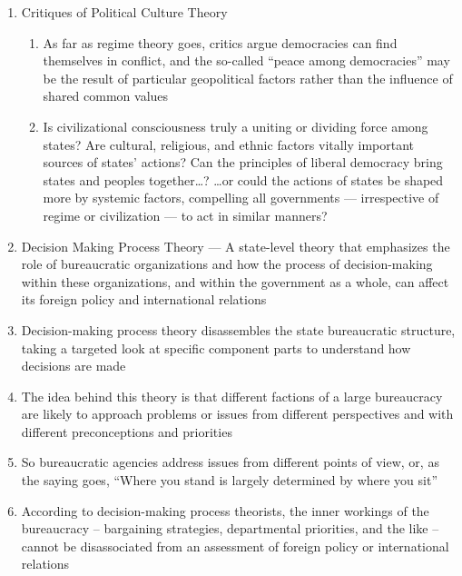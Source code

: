 \documentclass[12pt]{article}
\begin{document}
\begin{enumerate}
\begin{enumerate}
        \end{enumerate}

      \item Critiques of Political Culture Theory

        \begin{enumerate}

          \item As far as regime theory goes, critics argue democracies can find themselves in conflict, and the so-called “peace among democracies” may be the result of particular geopolitical factors rather than the influence of shared common values

          \item Is civilizational consciousness truly a uniting or dividing force among states? Are cultural, religious, and ethnic factors vitally important sources of states’ actions? Can the principles of liberal democracy bring states and peoples together\dots? \dots or could the actions of states be shaped more by systemic factors, compelling all governments — irrespective of regime or civilization — to act in similar manners?

        \end{enumerate}

      \item Decision Making Process Theory — A state-level theory that emphasizes the role of bureaucratic organizations and how the process of decision-making within these organizations, and within the government as a whole, can affect its foreign policy and international relations

      \item Decision-making process theory disassembles the state bureaucratic structure, taking a targeted look at specific component parts to understand how decisions are made

      \item The idea behind this theory is that different factions of a large bureaucracy are likely to approach problems or issues from different perspectives and with different preconceptions and priorities

      \item So bureaucratic agencies address issues from different points of view, or, as the saying goes, “Where you stand is largely determined by where you sit”

      \item According to decision-making process theorists, the inner workings of the bureaucracy – bargaining strategies, departmental priorities, and the like – cannot be disassociated from an assessment of foreign policy or international relations


\end{enumerate}
\end{document}
